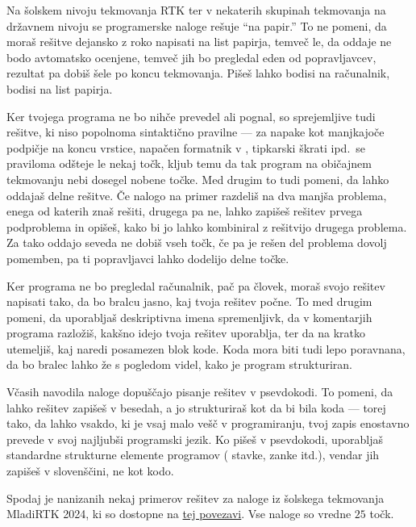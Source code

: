 
Na šolskem nivoju tekmovanja RTK ter v nekaterih skupinah tekmovanja na državnem
nivoju se programerske naloge rešuje \enquote{na papir.}
To ne pomeni, da moraš rešitve dejansko z roko napisati na list papirja, temveč
le, da oddaje ne bodo avtomatsko ocenjene, temveč jih bo pregledal eden od
popravljavcev, rezultat pa dobiš šele po koncu tekmovanja.
Pišeš lahko bodisi na računalnik, bodisi na list papirja.

Ker tvojega programa ne bo nihče prevedel ali pognal, so sprejemljive tudi
rešitve, ki niso popolnoma sintaktično pravilne --- za napake kot manjkajoče
podpičje na koncu vrstice, napačen formatnik v , tipkarski škrati
ipd.~se praviloma odšteje le nekaj točk, kljub temu da tak program na
običajnem tekmovanju nebi dosegel nobene točke.
Med drugim to tudi pomeni, da lahko oddajaš delne rešitve.
Če nalogo na primer razdeliš na dva manjša problema, enega od katerih znaš
rešiti, drugega pa ne, lahko zapišeš rešitev prvega podproblema in opišeš, kako
bi jo lahko kombiniral z rešitvijo drugega problema.
Za tako oddajo seveda ne dobiš vseh točk, če pa je rešen del problema dovolj
pomemben, pa ti popravljavci lahko dodelijo delne točke.

Ker programa ne bo pregledal računalnik, pač pa človek, moraš svojo rešitev
napisati tako, da bo bralcu jasno, kaj tvoja rešitev počne.
To med drugim pomeni, da uporabljaš deskriptivna imena spremenljivk, da v
komentarjih programa razložiš, kakšno idejo tvoja rešitev uporablja, ter da na
kratko utemeljiš, kaj naredi posamezen blok kode.
Koda mora biti tudi lepo poravnana, da bo bralec lahko že s pogledom videl, kako
je program strukturiran.

Včasih navodila naloge dopuščajo pisanje rešitev v psevdokodi.
To pomeni, da lahko rešitev zapišeš v besedah, a jo strukturiraš kot da bi bila
koda --- torej tako, da lahko vsakdo, ki je vsaj malo vešč v programiranju, tvoj
zapis enostavno prevede v svoj najljubši programski jezik.
Ko pišeš v psevdokodi, uporabljaš standardne strukturne elemente programov
( stavke,  zanke itd.), vendar jih zapišeš v slovenščini, ne
kot kodo.


Spodaj je nanizanih nekaj primerov rešitev za naloge iz šolskega tekmovanja
MladiRTK 2024, ki so dostopne na
\href{https://rtk.ijs.si/2024/mladirtk2024-solsko-naloge-resitve-kriterij.pdf}{tej
povezavi}.
Vse naloge so vredne $25$ točk.


